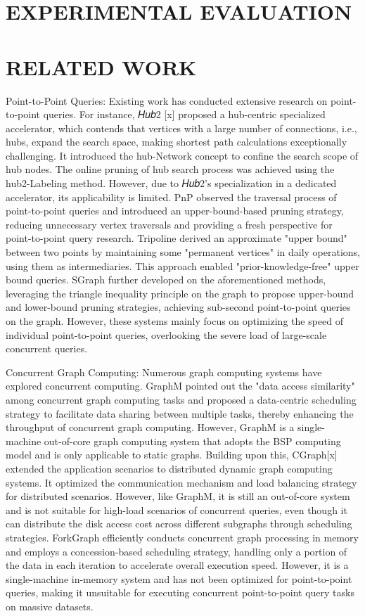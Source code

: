 \documentclass[lettersize,journal]{IEEEtran} %
\begin{document}
\section{EXPERIMENTAL EVALUATION}

\section{RELATED WORK}
Point-to-Point Queries: Existing work has conducted extensive research on point-to-point queries. For instance, 𝐻𝑢𝑏2 [x] proposed a hub-centric specialized accelerator, which contends that vertices with a large number of connections, i.e., hubs, expand the search space, making shortest path calculations exceptionally challenging. It introduced the hub-Network concept to confine the search scope of hub nodes. The online pruning of hub search process was achieved using the hub2-Labeling method. However, due to 𝐻𝑢𝑏2's specialization in a dedicated accelerator, its applicability is limited. PnP observed the traversal process of point-to-point queries and introduced an upper-bound-based pruning strategy, reducing unnecessary vertex traversals and providing a fresh perspective for point-to-point query research. Tripoline derived an approximate "upper bound" between two points by maintaining some "permanent vertices" in daily operations, using them as intermediaries. This approach enabled "prior-knowledge-free" upper bound queries. SGraph further developed on the aforementioned methods, leveraging the triangle inequality principle on the graph to propose upper-bound and lower-bound pruning strategies, achieving sub-second point-to-point queries on the graph. However, these systems mainly focus on optimizing the speed of individual point-to-point queries, overlooking the severe load of large-scale concurrent queries.

Concurrent Graph Computing: Numerous graph computing systems have explored concurrent computing. GraphM pointed out the "data access similarity" among concurrent graph computing tasks and proposed a data-centric scheduling strategy to facilitate data sharing between multiple tasks, thereby enhancing the throughput of concurrent graph computing. However, GraphM is a single-machine out-of-core graph computing system that adopts the BSP computing model and is only applicable to static graphs. Building upon this, CGraph[x] extended the application scenarios to distributed dynamic graph computing systems. It optimized the communication mechanism and load balancing strategy for distributed scenarios. However, like GraphM, it is still an out-of-core system and is not suitable for high-load scenarios of concurrent queries, even though it can distribute the disk access cost across different subgraphs through scheduling strategies. ForkGraph efficiently conducts concurrent graph processing in memory and employs a concession-based scheduling strategy, handling only a portion of the data in each iteration to accelerate overall execution speed. However, it is a single-machine in-memory system and has not been optimized for point-to-point queries, making it unsuitable for executing concurrent point-to-point query tasks on massive datasets.
\end{document}

